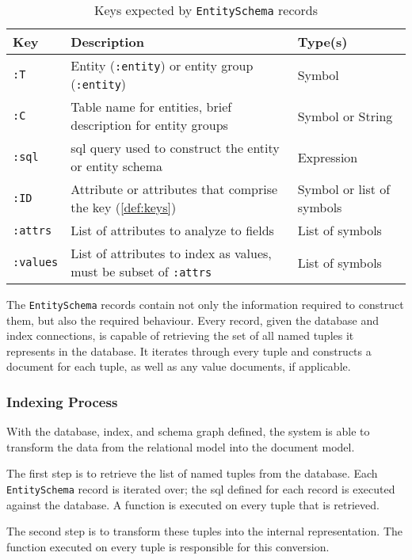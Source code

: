			\begin{table}
				\centering
				
				\begin{tabular}{lp{9cm}l}
					\toprule
					Key & Description & Type(s) \\
					\midrule
					\texttt{:T} & Entity (\texttt{:entity}) or entity group (\texttt{:entity}) & Symbol \\
					\texttt{:C} & Table name for entities, brief description for entity groups & Symbol or String \\
					\texttt{:sql} & \Gls{sql} query used to construct the entity or entity schema & Expression \\
					\texttt{:ID} & Attribute or attributes that comprise the key (\vref{def:keys}) & Symbol or list of symbols \\
					\texttt{:attrs} & List of attributes to analyze to fields & List of symbols \\
					\texttt{:values} & List of attributes to index as values, must be subset of \texttt{:attrs} & List of symbols \\
					\bottomrule
				\end{tabular}
				
				\caption{Keys expected by \texttt{EntitySchema} records}
				\label{tbl:entity-schema-keys}
			\end{table}
			
			The \texttt{EntitySchema} records contain not only the information required to construct them, but also the required behaviour.  Every record, given the database and index connections, is capable of retrieving the set of all named tuples it represents in the database.  It iterates through every tuple and constructs a document for each tuple, as well as any value documents, if applicable.
			
		\subsubsection{Indexing Process}
			With the database, index, and schema graph defined, the system is able to transform the data from the relational model into the document model.
			
			The first step is to retrieve the list of named tuples from the database.  Each \texttt{EntitySchema} record is iterated over; the \gls{sql} defined for each record is executed against the database.  A function is executed on every tuple that is retrieved.
			
			The second step is to transform these tuples into the internal representation.  The function executed on every tuple is responsible for this conversion.
			
